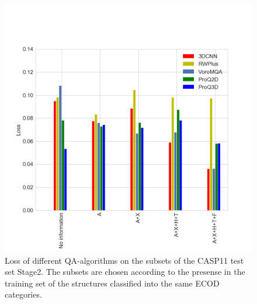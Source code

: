 \begin{figure}[H]
    \centering
    \includegraphics[width=\linewidth]{Fig/LossVsECOD.png}
    \caption{Loss of different QA-algorithms on the subsets of the CASP11 test set Stage2. The subsets are chosen according to the presense in the
    training set of the structures classified into the same ECOD categories.}
    \label{Fig:LossVsECOD}
\end{figure}
